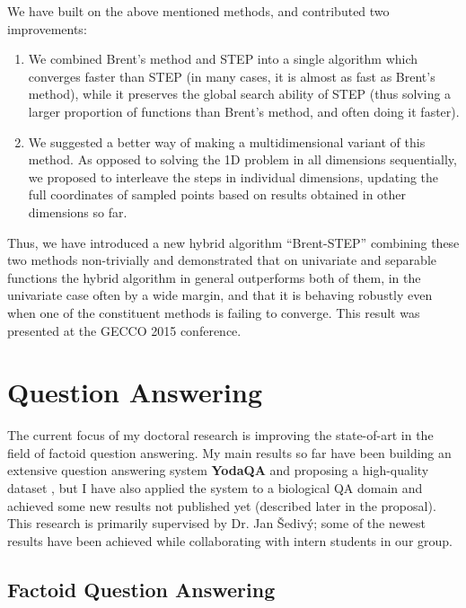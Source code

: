 We have built on the above mentioned methods, and contributed two improvements:

\begin{enumerate}
	\item We combined Brent's method and STEP into a single algorithm which converges faster than STEP (in many cases, it is almost as fast as Brent's method), while it preserves the global search ability of STEP (thus solving a larger proportion of functions than Brent's method, and often doing it faster).

	\item We suggested a better way of making a multidimensional variant of this method. As opposed to solving the 1D problem in all dimensions sequentially, we proposed to interleave the steps in individual dimensions, updating the full coordinates of sampled points based on results obtained in other dimensions so far.
\end{enumerate}

Thus, we have introduced a new hybrid algorithm ``Brent-STEP'' combining
these two methods non-trivially and demonstrated that
on univariate and separable functions the hybrid algorithm
in general outperforms both of them,
in the univariate case often by a wide margin,
and that it is behaving robustly even when one of the constituent methods
is failing to converge.
This result was presented at the GECCO 2015 conference.
\cite{ndsqistep}

\section{Question Answering}

The current focus of my doctoral research
is improving the state-of-art in the field of factoid question answering.
My main results so far have been
building an extensive question answering system \textbf{YodaQA} \cite{YodaQAPoster2015}
and proposing a high-quality dataset \cite{YodaQACLEF2015},
but I have also applied the system to a biological QA domain \cite{YodaQABioASQ2015}
and achieved some new results not published yet (described later in the proposal).
This research is primarily supervised by Dr. Jan Šedivý;
some of the newest results have been achieved while collaborating
with intern students in our group.

\subsection{Factoid Question Answering}

